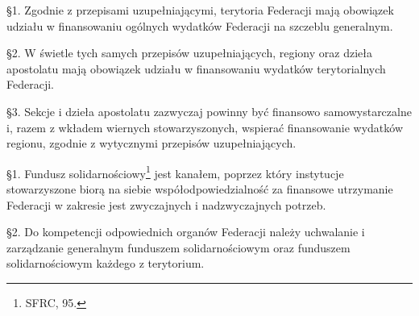  \S{}1. Zgodnie z przepisami uzupełniającymi, terytoria Federacji mają obowiązek udziału w finansowaniu ogólnych wydatków Federacji na szczeblu generalnym.

\S{}2. W świetle tych samych przepisów uzupełniających, regiony oraz dzieła apostolatu mają obowiązek udziału w finansowaniu wydatków terytorialnych Federacji.

\S{}3. Sekcje i dzieła apostolatu zazwyczaj powinny być finansowo samowystarczalne i, razem z wkładem wiernych stowarzyszonych, wspierać finansowanie wydatków regionu, zgodnie z wytycznymi przepisów uzupełniających.


 \S{}1. Fundusz solidarnościowy\footnote{SFRC, 95.} jest kanałem, poprzez który instytucje stowarzyszone biorą na siebie współodpowiedzialność za finansowe utrzymanie Federacji w zakresie jest zwyczajnych i nadzwyczajnych potrzeb.

\S{}2. Do kompetencji odpowiednich organów Federacji należy uchwalanie i zarządzanie generalnym funduszem solidarnościowym oraz funduszem solidarnościowym każdego z terytorium. 
